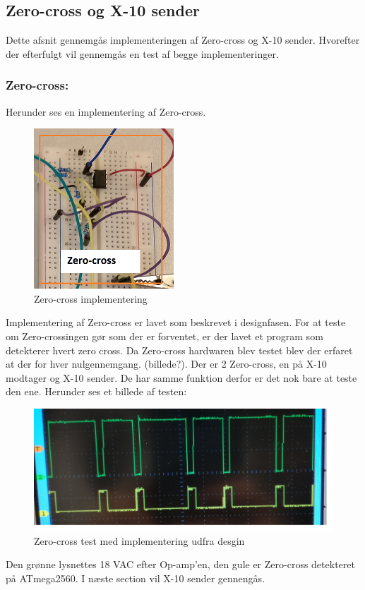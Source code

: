 \documentclass[11pt]{article}
\begin{document}
\subsection{Zero-cross og X-10 sender}
Dette afsnit gennemgås implementeringen af Zero-cross og X-10 sender. Hvorefter der efterfulgt vil gennemgås en test af begge implementeringer. \subsubsection{Zero-cross:}
\label{sec:Zero-cross}
Herunder ses en implementering af Zero-cross.
\begin{figure}[H]
\centering
\includegraphics[scale = 1.5]{Zerocrossimplementering}
\caption{Zero-cross implementering}
\end{figure}
Implementering af Zero-cross er lavet som beskrevet i designfasen. For at teste om Zero-crossingen gør som der er forventet, er der lavet et program som detekterer hvert zero cross. Da Zero-cross hardwaren blev testet blev der erfaret at der for hver nulgennemgang. (billede?). Der er 2 Zero-cross, en på X-10 modtager og X-10 sender. De har samme funktion derfor er det nok bare at teste den ene. Herunder ses et billede af testen: 
\begin{figure}[H]
\centering
\includegraphics[scale = 0.2]{zerocrosstest}
\caption{Zero-cross test med implementering udfra desgin}
\end{figure}
Den grønne lysnettes 18 VAC efter Op-amp'en, den gule er Zero-cross detekteret på ATmega2560. I næste section vil X-10 sender gennengås.
\end{document}

